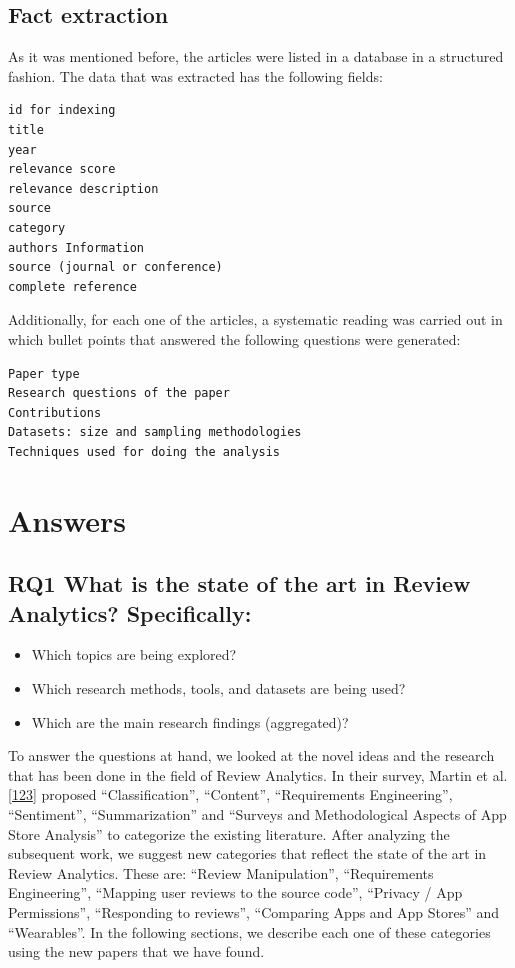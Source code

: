 \documentclass[]{book}
\providecommand{\tightlist}{%
  \setlength{\itemsep}{0pt}\setlength{\parskip}{0pt}}
\begin{document}
\subsection{Fact extraction}\label{fact-extraction}

As it was mentioned before, the articles were listed in a database in a
structured fashion. The data that was extracted has the following
fields:

\begin{verbatim}
id for indexing
title
year 
relevance score 
relevance description 
source 
category
authors Information
source (journal or conference)
complete reference
\end{verbatim}

Additionally, for each one of the articles, a systematic reading was
carried out in which bullet points that answered the following questions
were generated:

\begin{verbatim}
Paper type
Research questions of the paper
Contributions
Datasets: size and sampling methodologies
Techniques used for doing the analysis 
\end{verbatim}

\section{Answers}\label{answers-5}

\subsection{\texorpdfstring{\textbf{RQ1} What is the state of the art in
Review Analytics?
Specifically:}{RQ1 What is the state of the art in Review Analytics? Specifically:}}\label{rq1-what-is-the-state-of-the-art-in-review-analytics-specifically}

\begin{itemize}
\tightlist
\item
  Which topics are being explored?
\item
  Which research methods, tools, and datasets are being used?
\item
  Which are the main research findings (aggregated)?
\end{itemize}

To answer the questions at hand, we looked at the novel ideas and the
research that has been done in the field of Review Analytics. In their
survey, Martin et al.
{[}\protect\hyperlink{ref-martin2015survey}{123}{]} proposed
``Classification'', ``Content'', ``Requirements Engineering'',
``Sentiment'', ``Summarization'' and ``Surveys and Methodological
Aspects of App Store Analysis'' to categorize the existing literature.
After analyzing the subsequent work, we suggest new categories that
reflect the state of the art in Review Analytics. These are: ``Review
Manipulation'', ``Requirements Engineering'', ``Mapping user reviews to
the source code'', ``Privacy / App Permissions'', ``Responding to
reviews'', ``Comparing Apps and App Stores'' and ``Wearables''. In the
following sections, we describe each one of these categories using the
new papers that we have found.
\end{document}
